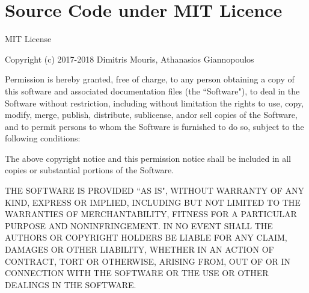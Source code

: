 \chapter{Source Code under MIT Licence}\label{AppendixA}

MIT License

Copyright (c) 2017-2018 Dimitris Mouris, Athanasios Giannopoulos

Permission is hereby granted, free of charge, to any person obtaining a copy of this software and associated documentation files (the ``Software"), to deal in the Software without restriction, including without limitation the rights to use, copy, modify, merge, publish, distribute, sublicense, and\myslash or sell copies of the Software, and to permit persons to whom the Software is furnished to do so, subject to the following conditions:

The above copyright notice and this permission notice shall be included in all copies or substantial portions of the Software.\par

THE SOFTWARE IS PROVIDED ``AS IS", WITHOUT WARRANTY OF ANY KIND, EXPRESS OR IMPLIED, INCLUDING BUT NOT LIMITED TO THE WARRANTIES OF MERCHANTABILITY, FITNESS FOR A PARTICULAR PURPOSE AND NONINFRINGEMENT.
IN NO EVENT SHALL THE AUTHORS OR COPYRIGHT HOLDERS BE LIABLE FOR ANY CLAIM, DAMAGES OR OTHER LIABILITY, WHETHER IN AN ACTION OF CONTRACT, TORT OR OTHERWISE, ARISING FROM, OUT OF OR IN CONNECTION WITH THE SOFTWARE OR THE USE OR OTHER DEALINGS IN THE SOFTWARE.
